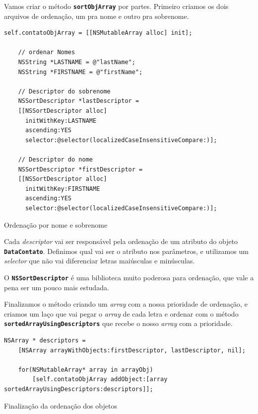 \documentclass[a4paper,12pt,brazil,doubleside]{book}
\begin{document}
\begin{singlespace}
Vamos criar o método \texttt{\textbf{sortObjArray}} por partes. Primeiro criamos os dois arquivos de ordenação, um pra nome e outro pra sobrenome.

\begin{listing}[H]
\begin{verbatim}
self.contatoObjArray = [[NSMutableArray alloc] init];
    
    // ordenar Nomes
    NSString *LASTNAME = @"lastName";
    NSString *FIRSTNAME = @"firstName";
    
    // Descriptor do sobrenome
    NSSortDescriptor *lastDescriptor =
    [[NSSortDescriptor alloc]
      initWithKey:LASTNAME
      ascending:YES
      selector:@selector(localizedCaseInsensitiveCompare:)];
    
    // Descriptor do nome
    NSSortDescriptor *firstDescriptor =
    [[NSSortDescriptor alloc]
      initWithKey:FIRSTNAME
      ascending:YES
      selector:@selector(localizedCaseInsensitiveCompare:)];
\end{verbatim}
\caption{Ordenação por nome e sobrenome}
\end{listing}


Cada \emph{descriptor} vai ser responsável pela ordenação de um atributo do objeto \texttt{\textbf{DataContato}}. Definimos qual vai ser o atributo nos parâmetros, e utilizamos um \emph{selector} que não vai diferenciar letras maiúsculas e minúsculas.

O \texttt{\textbf{NSSortDescriptor}} é uma biblioteca muito poderosa para ordenação, que vale a pena ser um pouco mais estudada.

Finalizamos o método criando um \emph{array} com a nossa prioridade de ordenação, e criamos um laço que vai pegar o \emph{array} de cada letra e ordenar com o método \texttt{\textbf{sortedArrayUsingDescriptors}} que recebe o nosso \emph{array} com a prioridade.

\begin{listing}[H]
\begin{verbatim}
NSArray * descriptors =
    [NSArray arrayWithObjects:firstDescriptor, lastDescriptor, nil];
      
    for(NSMutableArray* array in arrayObj)
        [self.contatoObjArray addObject:[array sortedArrayUsingDescriptors:descriptors]];
\end{verbatim}
\caption{Finalização da ordenação dos objetos}
\end{listing}


\end{singlespace}
\end{document}

